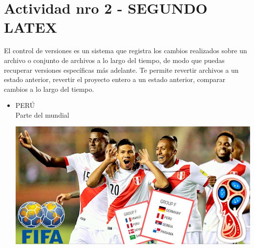 \section{Actividad nro 2 - SEGUNDO LATEX}

\vspace*{0.1in}
\begin{large}
 El control de versiones es un sistema que registra los cambios realizados sobre un archivo o conjunto de archivos a lo largo del tiempo, de modo que puedas recuperar versiones específicas más adelante. Te permite revertir archivos a un estado anterior, revertir el proyecto entero a un estado anterior, comparar cambios a lo largo del tiempo.\\
\end{large}


\begin{itemize}
	\item PERÚ
	\\Parte del mundial 
	\begin{center}
	\includegraphics[width=15cm]{./Imagenes/act2_1} 
	\end{center}

\end{itemize}